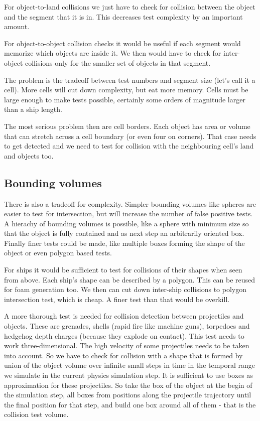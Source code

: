 \documentclass[english,a4paper,12pt]{report}
\begin{document}
For object-to-land collisions we just have to check for collision
between the object and the segment that it is in. This decreases test
complexity by an important amount.

For object-to-object collision checks it would be useful if each segment
would memorize which objects are inside it. We then would have to check
for inter-object collisions only for the smaller set of objects in that
segment.

The problem is the tradeoff between test numbers and segment size (let's
call it a cell). More cells will cut down complexity, but eat more
memory. Cells must be large enough to make tests possible, certainly
some orders of magnitude larger than a ship length.

The most serious problem then are cell borders. Each object has area or
volume that can stretch across a cell boundary (or even four on
corners). That case needs to get detected and we need to test for
collision with the neighbouring cell's land and objects too.

\subsection{Bounding volumes}

There is also a tradeoff for complexity. Simpler bounding volumes like
spheres are easier to test for intersection, but will increase the
number of false positive tests. A hierachy of bounding volumes is
possible, like a sphere with minimum size so that the object is fully
contained and as next step an arbitrarily oriented box. Finally finer
tests could be made, like multiple boxes forming the shape of the object
or even polygon based tests.

For ships it would be sufficient to test for collisions of their shapes
when seen from above. Each ship's shape can be described by a polygon.
This can be reused for foam generation too. We then can cut down
inter-ship collisions to polygon intersection test, which is cheap. A
finer test than that would be overkill.

A more thorough test is needed for collision detection between
projectiles and objects. These are grenades, shells (rapid fire like
machine guns), torpedoes and hedgehog depth charges (because they
explode on contact). This test needs to work three-dimensional. The high
velocity of some projectiles needs to be taken into account. So we have
to check for collision with a shape that is formed by union of the
object volume over infinite small steps in time in the temporal range we
simulate in the current physics simulation step. It is sufficient to use
boxes as approximation for these projectiles. So take the box of the
object at the begin of the simulation step, all boxes from positions
along the projectile trajectory until the final position for that step,
and build one box around all of them - that is the collision test
volume.
\end{document}
